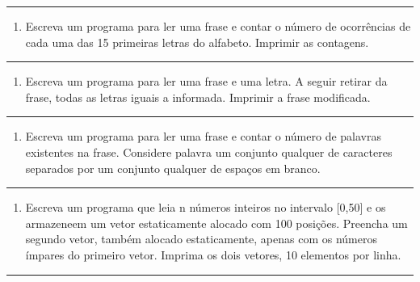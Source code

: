 \documentclass[12pt,a4paper]{article}
\providecommand{\tightlist}{%
      \setlength{\itemsep}{0pt}\setlength{\parskip}{0pt}}
\begin{document}
    \begin{center}\rule{0.5\linewidth}{0.5pt}\end{center}

\begin{enumerate}
\def\labelenumi{\arabic{enumi}.}
\setcounter{enumi}{22}
\tightlist
\item
  Escreva um programa para ler uma frase e contar o número de
  ocorrências de cada uma das 15 primeiras letras do alfabeto. Imprimir
  as contagens.
\end{enumerate}

    \begin{center}\rule{0.5\linewidth}{0.5pt}\end{center}

\begin{enumerate}
\def\labelenumi{\arabic{enumi}.}
\setcounter{enumi}{23}
\tightlist
\item
  Escreva um programa para ler uma frase e uma letra. A seguir retirar
  da frase, todas as letras iguais a informada. Imprimir a frase
  modificada.
\end{enumerate}

    \begin{center}\rule{0.5\linewidth}{0.5pt}\end{center}

\begin{enumerate}
\def\labelenumi{\arabic{enumi}.}
\setcounter{enumi}{24}
\tightlist
\item
  Escreva um programa para ler uma frase e contar o número de palavras
  existentes na frase. Considere palavra um conjunto qualquer de
  caracteres separados por um conjunto qualquer de espaços em branco.
\end{enumerate}

    \begin{center}\rule{0.5\linewidth}{0.5pt}\end{center}

\begin{enumerate}
\def\labelenumi{\arabic{enumi}.}
\setcounter{enumi}{25}
\tightlist
\item
  Escreva um programa que leia n números inteiros no intervalo
  {[}0,50{]} e os armazeneem um vetor estaticamente alocado com 100
  posições. Preencha um segundo vetor, também alocado estaticamente,
  apenas com os números ímpares do primeiro vetor. Imprima os dois
  vetores, 10 elementos por linha.
\end{enumerate}

    \begin{center}\rule{0.5\linewidth}{0.5pt}\end{center}
\end{document}

